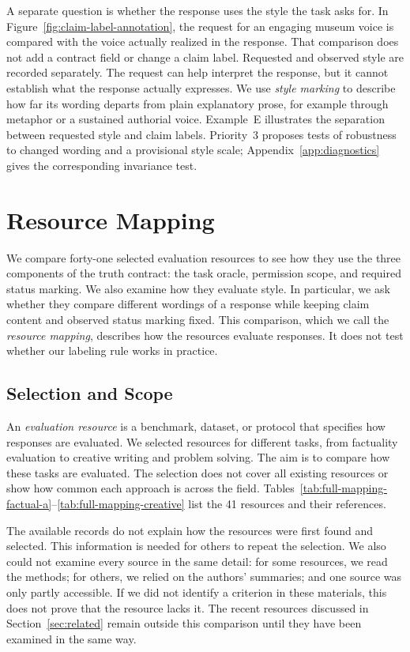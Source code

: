 \documentclass{clv2025}
\begin{document}
A separate question is whether the response uses the style the task asks
for. In Figure~\ref{fig:claim-label-annotation}, the request for an engaging
museum voice is compared with the voice actually realized in the response.
That comparison does not add a contract field or change a claim label. Requested and observed style are recorded separately. The request can
help interpret the response, but it cannot establish what the response
actually expresses. We use \emph{style marking} to describe how far its
wording departs from plain explanatory prose, for example through metaphor
or a sustained authorial voice. Example~E illustrates the separation between
requested style and claim labels. Priority~3 proposes tests of robustness
to changed wording and a provisional style scale; Appendix~\ref{app:diagnostics}
gives the corresponding invariance test.

\section{Resource Mapping}\label{sec:methodology}

We compare forty-one selected evaluation resources to see how they use the
three components of the truth contract: the task oracle, permission scope,
and required status marking. We also examine how they evaluate style.
In particular, we ask whether they compare different wordings of a response
while keeping claim content and observed status marking fixed. This
comparison, which we call the \emph{resource mapping}, describes how the
resources evaluate responses. It does not test whether our labeling rule
works in practice.

\subsection{Selection and Scope}

An \emph{evaluation resource} is a benchmark, dataset, or protocol that
specifies how responses are evaluated. We selected resources for different
tasks, from factuality evaluation to creative writing and problem solving.
The aim is to compare how these tasks are evaluated. The selection does not
cover all existing resources or show how common each approach is across
the field. Tables~\ref{tab:full-mapping-factual-a}--\ref{tab:full-mapping-creative}
list the 41 resources and their references.

The available records do not explain how the resources were first found
and selected. This information is needed for others to repeat the selection.
We also could not examine every source in the same detail: for some resources,
we read the methods; for others, we relied on the authors' summaries; and
one source was only partly accessible. If we did not identify a criterion
in these materials, this does not prove that the resource lacks it.
The recent resources discussed in Section~\ref{sec:related} remain outside
this comparison until they have been examined in the same way.
\end{document}
